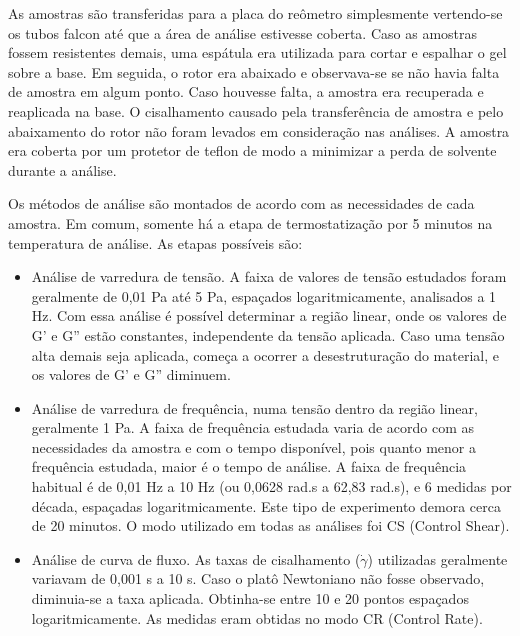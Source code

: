 		As amostras são transferidas para a placa do reômetro simplesmente vertendo-se os tubos falcon até que a área de análise estivesse coberta. Caso as amostras fossem resistentes demais, uma espátula era utilizada para cortar e espalhar o gel sobre a base. Em seguida, o rotor era abaixado e observava-se se não havia falta de amostra em algum ponto. Caso houvesse falta, a amostra era recuperada e reaplicada na base. O cisalhamento causado pela transferência de amostra e pelo abaixamento do rotor não foram levados em consideração nas análises. A amostra era coberta por um protetor de teflon de modo a minimizar a perda de solvente durante a análise.
		
		Os métodos de análise são montados de acordo com as necessidades de cada amostra. Em comum, somente há a etapa de termostatização por 5 minutos na temperatura de análise. As etapas possíveis são:
		
		\begin{itemize}
			\item Análise de varredura de tensão. A faixa de valores de tensão estudados foram geralmente de 0,01 Pa até 5 Pa, espaçados logaritmicamente, analisados a 1 Hz. Com essa análise é possível determinar a região linear, onde os valores de G' e G'' estão constantes, independente da tensão aplicada. Caso uma tensão alta demais seja aplicada, começa a ocorrer a desestruturação do material, e os valores de G' e G'' diminuem.
			
			\item Análise de varredura de frequência, numa tensão dentro da região linear, geralmente 1 Pa. A faixa de frequência estudada varia de acordo com as necessidades da amostra e com o tempo disponível, pois quanto menor a frequência estudada, maior é o tempo de análise. A faixa de frequência habitual é de 0,01 Hz a 10 Hz (ou 0,0628 rad.s\menosUm{} a 62,83 rad.s\menosUm), e 6 medidas por década, espaçadas logaritmicamente. Este tipo de experimento demora cerca de 20 minutos. O modo utilizado em todas as análises foi CS (Control Shear).
			
			\item Análise de curva de fluxo. As taxas de cisalhamento (\(\dot{\gamma}\)) utilizadas geralmente variavam de 0,001 s\menosUm{} a 10 s\menosUm. Caso o platô Newtoniano não fosse observado, diminuia-se a taxa aplicada. Obtinha-se entre 10 e 20 pontos espaçados logaritmicamente. As medidas eram obtidas no modo CR (Control Rate).
		\end{itemize}
		
